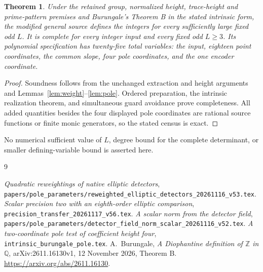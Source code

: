 \documentclass[11pt,a4paper]{article}
\newtheorem{theorem}{Theorem}[section]
\begin{document}
\begin{theorem}
Under the retained group, normalized height, trace-height and
prime-pattern premises and Burungale's Theorem B in the stated
intrinsic form, the modified general source defines the integers
for every sufficiently large fixed odd \(L\). It is complete
for every integer input and every fixed odd \(L\ge3\).
Its polynomial specification has twenty-five total variables:
the input, eighteen point coordinates, the common slope, four
pole coordinates, and the one encoder coordinate.
\end{theorem}
\begin{proof}
Soundness follows from the unchanged extraction and height arguments
and Lemmas~\ref{lem:weight}--\ref{lem:pole}. Ordered preparation,
the intrinsic realization theorem, and simultaneous guard avoidance
prove completeness. All added quantities besides the four displayed
pole coordinates are rational source functions or finite monic
generators, so the stated census is exact.
\end{proof}

No numerical sufficient value of \(L\), degree bound for the complete
determinant, or smaller defining-variable bound is asserted here.

\begin{thebibliography}{9}\raggedright
{}\emph{Quadratic reweightings of native elliptic detectors},
\nolinkurl{papers/pole_parameters/reweighted_elliptic_detectors_20261116_v53.tex}.
\emph{Scalar precision two with an eighth-order elliptic comparison},
\nolinkurl{precision_transfer_20261117_v56.tex}.
\emph{A scalar norm from the detector field},
\nolinkurl{papers/pole_parameters/detector_field_norm_scalar_20261116_v52.tex}.
\emph{A two-coordinate pole test of coefficient height four},
\nolinkurl{intrinsic_burungale_pole.tex}.
A.~Burungale,
\emph{A Diophantine definition of $\mathbb Z$ in $\mathbb Q$},
arXiv:2611.16130v1, 12 November 2026, Theorem B.
\url{https://arxiv.org/abs/2611.16130}.
\end{thebibliography}
\end{document}
